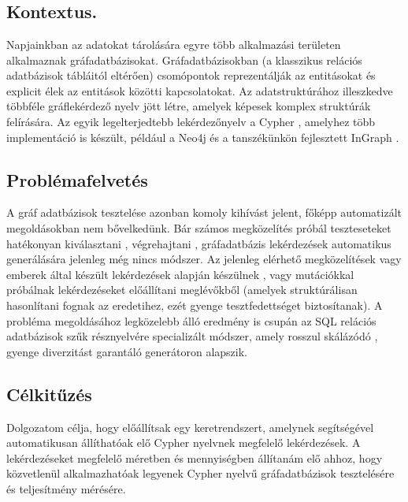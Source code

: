 \chapter{\bevezetes}


\section{Kontextus.}
Napjainkban az adatokat tárolására egyre több alkalmazási területen alkalmaznak gráfadatbázisokat. Gráfadatbázisokban (a klasszikus relációs adatbázisok tábláitól eltérően) csomópontok reprezentálják az entitásokat és explicit élek az entitások közötti kapcsolatokat. Az adatstruktúrához illeszkedve többféle gráflekérdező nyelv jött létre, amelyek képesek komplex struktúrák felírására. Az egyik legelterjedtebb lekérdezőnyelv a Cypher \cite{Cypher}, amelyhez több implementáció is készült, például a Neo4j \cite{neo4j} és a tanszékünkön fejlesztett InGraph \cite{marton2017model}.


\section{Problémafelvetés}
A gráf adatbázisok tesztelése azonban komoly kihívást jelent, főképp automatizált megoldásokban nem bővelkedünk. Bár számos megközelítés próbál teszteseteket hatékonyan kiválasztani \cite{myint2018test}, végrehajtani \cite{yan2018snowtrail}, gráfadatbázis lekérdezések automatikus generálására jelenleg még nincs módszer. Az jelenleg elérhető megközelítések vagy emberek által készült lekérdezések alapján készülnek \cite{yan2018snowtrail}, vagy mutációkkal próbálnak lekérdezéseket előállítani meglévőkből \cite{tuya2006sqlmutation} (amelyek struktúrálisan hasonlítani fognak az eredetihez, ezét gyenge tesztfedettséget biztosítanak). A probléma megoldásához legközelebb álló eredmény \cite{DBLP:conf} is csupán az SQL relációs adatbázisok szűk résznyelvére specializált módszer, amely rosszul skálázódó \cite{viatrasolver} , gyenge diverzitást garantáló \cite{semerath2018iterative} generátoron alapszik.


\section{Célkitűzés}
Dolgozatom célja, hogy előállítsak egy keretrendszert, amelynek segítségével automatikusan állíthatóak elő  Cypher \cite{Cypher} nyelvnek megfelelő lekérdezések. A lekérdezéseket megfelelő  méretben és mennyiségben állítanám elő ahhoz, hogy közvetlenül alkalmazhatóak legyenek Cypher nyelvű gráfadatbázisok tesztelésére és teljesítmény mérésére.  

